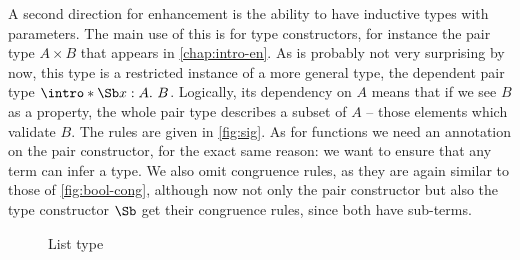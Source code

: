 \AP A second direction for enhancement is the ability to have inductive types with parameters.
The main use of this is for type constructors, for instance the pair type $A \times B$
that appears in \cref{chap:intro-en}. As is probably not very surprising by
now, this type is a restricted instance of a more general type, the
dependent pair type $\intro*\Sb x : A.\ B$.
Logically, its dependency on $A$ means that if we see $B$ as a property,
the whole pair type describes a subset of $A$ – those elements
which validate $B$. The rules are given in \cref{fig:sig}.
As for functions we need an annotation on
the pair constructor, for the exact same reason: we want to ensure that any term can
infer a type. We also omit congruence rules, as they are again similar to those of
\cref{fig:bool-cong}, although now not only the pair constructor but also the type constructor
$\Sb$ get their congruence rules, since both have sub-terms.

\begin{figure}
  \AP
{}
\caption{List type}
\label{fig:list}
\end{figure}

